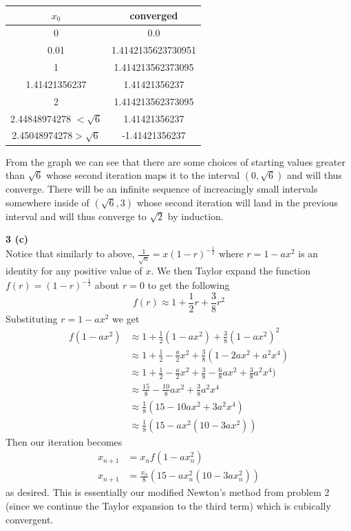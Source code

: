 \documentclass[12pt]{article}
\newcommand{\problem}[1]{\hspace{-4 ex} \large \textbf{#1}\\}
\begin{document}
	\singlespacing
	\begin{center}
		\begin{tabular}{|c|c|}
			\hline
			$x_0$&converged\\ \hline
			0&0.0\\ \hline
			0.01&1.4142135623730951\\ \hline
			1&1.414213562373095\\ \hline
			1.41421356237&1.41421356237\\ \hline
			2&1.414213562373095\\ \hline
			2.44848974278 $<\sqrt{6}$&1.41421356237\\ \hline
			2.45048974278$>\sqrt{6}$&-1.41421356237\\ \hline
		\end{tabular}
	\end{center}
	\doublespacing
	
	From the graph we can see that there are some choices of starting values greater than $\sqrt{6}$ whose second iteration maps it to the interval $(0,\sqrt{6})$ and will thus converge. There will be an infinite sequence of increacingly small intervals somewhere inside of $(\sqrt{6}, 3)$ whose second iteration will land in the previous interval and will thus converge to $\sqrt{2}$ by induction. 
	
	
\problem{3 (c)}
	Notice that similarly to above, $\frac{1}{\sqrt{a}}=x(1-r)^{-\frac{1}{2}}$ where $r=1-ax^2$ is an identity for any positive value of $x$. We then Taylor expand the function $f(r)=(1-r)^{-\frac{1}{2}}$ about $r=0$ to get the following
	$$
	f(r) \approx 1 + \frac{1}{2}r + \frac{3}{8}r^2
	$$
	Substituting $r=1-ax^2$ we get
	\begin{align*}
		f(1-ax^2) & \approx 1 + \frac{1}{2}(1-ax^2) + \frac{3}{8}(1-ax^2)^2\\
		& \approx 1 + \frac{1}{2} - \frac{a}{2}x^2 + \frac{3}{8}(1-2ax^2 + a^2x^4) \\
		& \approx 1 + \frac{1}{2} - \frac{a}{2}x^2 + \frac{3}{8} -\frac{6}{8}ax^2 + \frac{3}{8}a^2x^4) \\
		& \approx \frac{15}{8} - \frac{10}{8}ax^2 + \frac{3}{8}a^2x^4\\
		& \approx \frac{1}{8}(15 - 10ax^2 + 3a^2x^4)\\
		& \approx \frac{1}{8}(15 - ax^2(10 - 3ax^2))
	\end{align*}
	Then our iteration becomes
	\begin{align*}
		x_{n+1} & = x_nf(1-ax_n^2) \\
		x_{n+1} & = \frac{x_n}{8}(15 - ax_n^2(10 - 3ax_n^2))
	\end{align*}
	as desired. This is essentially our modified Newton's method from problem 2 (since we continue the Taylor expansion to the third term) which is cubically convergent.
	
\end{document}
